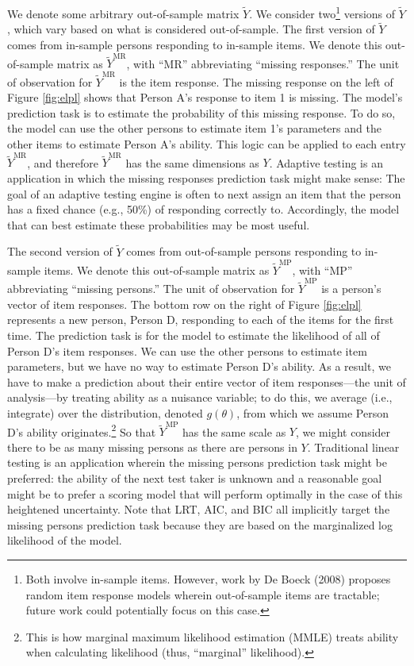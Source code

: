\documentclass[
  english,
  man,floatsintext]{apa7}
\begin{document}
We denote some arbitrary out-of-sample matrix \(\tilde Y\). We consider two\footnote{Both involve in-sample items. However, work by De Boeck (2008) proposes random item response models wherein out-of-sample items are tractable; future work could potentially focus on this case.} versions of \(\tilde Y\), which vary based on what is considered out-of-sample. The first version of \(\tilde Y\) comes from in-sample persons responding to in-sample items. We denote this out-of-sample matrix as \(\tilde Y^{\text{MR}}\), with ``MR'' abbreviating ``missing responses.'' The unit of observation for \(\tilde Y^{\text{MR}}\) is the item response. The missing response on the left of Figure \ref{fig:elpl} shows that Person A's response to item 1 is missing. The model's prediction task is to estimate the probability of this missing response. To do so, the model can use the other persons to estimate item 1's parameters and the other items to estimate Person A's ability. This logic can be applied to each entry \(\tilde Y^{\text{MR}}\), and therefore \(\tilde Y^{\text{MR}}\) has the same dimensions as \(Y\). Adaptive testing is an application in which the missing responses prediction task might make sense: The goal of an adaptive testing engine is often to next assign an item that the person has a fixed chance (e.g., 50\%) of responding correctly to. Accordingly, the model that can best estimate these probabilities may be most useful.

The second version of \(\tilde Y\) comes from out-of-sample persons responding to in-sample items. We denote this out-of-sample matrix as \(\tilde Y^{\text{MP}}\), with ``MP'' abbreviating ``missing persons.'' The unit of observation for \(\tilde Y^{\text{MP}}\) is a person's vector of item responses. The bottom row on the right of Figure \ref{fig:elpl} represents a new person, Person D, responding to each of the items for the first time. The prediction task is for the model to estimate the likelihood of all of Person D's item responses. We can use the other persons to estimate item parameters, but we have no way to estimate Person D's ability. As a result, we have to make a prediction about their entire vector of item responses---the unit of analysis---by treating ability as a nuisance variable; to do this, we average (i.e., integrate) over the distribution, denoted \(g(\theta)\), from which we assume Person D's ability originates.\footnote{This is how marginal maximum likelihood estimation (MMLE) treats ability when calculating likelihood (thus, ``marginal'' likelihood).} So that \(\tilde Y^{\text{MP}}\) has the same scale as \(Y\), we might consider there to be as many missing persons as there are persons in \(Y\). Traditional linear testing is an application wherein the missing persons prediction task might be preferred: the ability of the next test taker is unknown and a reasonable goal might be to prefer a scoring model that will perform optimally in the case of this heightened uncertainty. Note that LRT, AIC, and BIC all implicitly target the missing persons prediction task because they are based on the marginalized log likelihood of the model.
\end{document}
